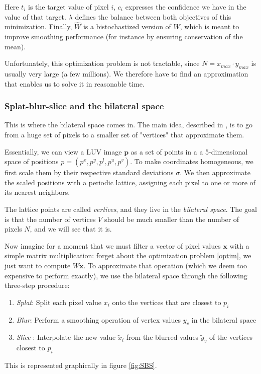 \documentclass{article}
\begin{document}
Here $t_i$ is the target value of pixel $i$, $c_i$ expresses the confidence we have in the value of that target. $\lambda$ defines the balance between both objectives of this minimization.
Finally, $\hat{W}$ is a bistochastized version of $W$, which is meant to improve smoothing performance (for instance by ensuring conservation of the mean).

\medskip

Unfortunately, this optimization problem is not tractable, since $N = x_{max} \cdot y_{max}$ is usually very large (a few millions). We therefore have to find an approximation that enables us to solve it in reasonable time.

\subsubsection{Splat-blur-slice and the bilateral space}

This is where the bilateral space comes in. The main idea, described in \cite{barron_fast_2015}, is to go from a huge set of pixels to a smaller set of "vertices" that approximate them. 

\medskip

Essentially, we can view a LUV image $\textbf{p}$ as a set of points in a a 5-dimensional space of positions $p = (p^x, p^y, p^l, p^u, p^v)$. To make coordinates homogeneous, we first scale them by their respective standard deviations $\sigma$. We then approximate the scaled positions with a periodic lattice, assigning each pixel to one or more of its nearest neighbors.

The lattice points are called \textit{vertices}, and they live in the \textit{bilateral space}. The goal is that the number of vertices $V$ should be much smaller than the number of pixels $N$, and we will see that it is.

\medskip

Now imagine for a moment that we must filter a vector of pixel values $\textbf{x}$ with a simple matrix multiplication: forget about the optimization problem \eqref{optim}, we just want to compute $W\textbf{x}$.
To approximate that operation (which we deem too expensive to perform exactly), we use the bilateral space through the following three-step procedure:
\begin{enumerate}
    \item \textit{Splat}: Split each pixel value $x_i$ onto the vertices that are closest to $p_i$
    \item \textit{Blur}: Perform a smoothing operation of vertex values $y_v$ in the bilateral space
    \item \textit{Slice} : Interpolate the new value $\tilde{x}_i$ from the blurred values $\tilde{y}_v$ of the vertices closest to $p_i$
\end{enumerate}
This is represented graphically in figure \ref{fig:SBS}.
\end{document}
